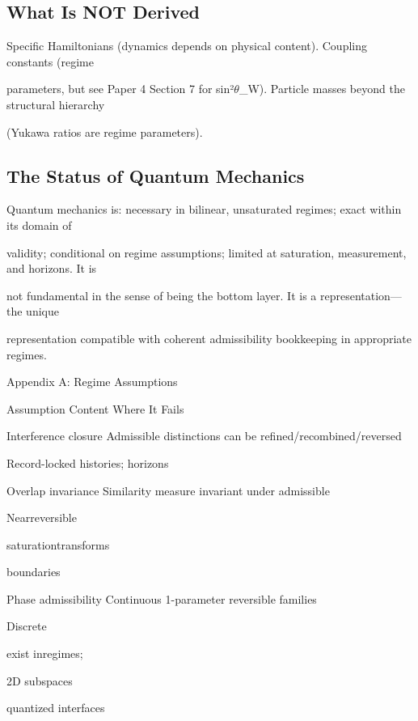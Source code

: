 \documentclass[11pt]{article}
\begin{document}
\subsection{What Is NOT Derived}

Specific Hamiltonians (dynamics depends on physical content). Coupling constants (regime

parameters, but see Paper 4 Section 7 for sin²$\theta$_W). Particle masses beyond the structural hierarchy

(Yukawa ratios are regime parameters).



\subsection{The Status of Quantum Mechanics}

Quantum mechanics is: necessary in bilinear, unsaturated regimes; exact within its domain of

validity; conditional on regime assumptions; limited at saturation, measurement, and horizons. It is

not fundamental in the sense of being the bottom layer. It is a representation---the unique

representation compatible with coherent admissibility bookkeeping in appropriate regimes.



Appendix A: Regime Assumptions

Assumption                Content                                       Where It Fails



Interference closure      Admissible distinctions can be refined/recombined/reversed

Record-locked histories; horizons



Overlap invariance        Similarity measure invariant under admissible

Nearreversible

saturationtransforms

boundaries



Phase admissibility       Continuous 1-parameter reversible families

Discrete

exist inregimes;

2D subspaces

quantized interfaces
\end{document}
